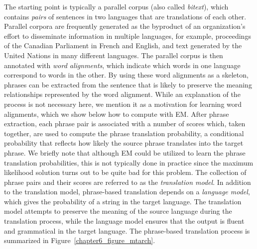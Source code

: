 The starting point is typically a parallel corpus (also called \emph{
  bitext}), which contains \emph{pairs} of sentences in two languages
that are translations of each other. Parallel corpora are frequently
generated as the byproduct of an organization's effort to disseminate
information in multiple languages, for example, proceedings of the
Canadian Parliament in French and English, and text generated by the
United Nations in many different languages.  The parallel corpus is
then annotated with \emph{word alignments}, which indicate which words
in one language correspond to words in the other.  By using these word
alignments as a skeleton, phrases can be extracted from the sentence
that is likely to preserve the meaning relationships represented by
the word alignment.  While an explanation of the process is not
necessary here, we mention it as a motivation for learning word
alignments, which we show below how to compute with EM.  After phrase
extraction, each phrase pair is associated with a number of scores
which, taken together, are used to compute the phrase translation
probability, a conditional probability that reflects how likely the
source phrase translates into the target phrase.  We briefly note that
although EM could be utilized to learn the phrase translation
probabilities, this is not typically done in practice since the
maximum likelihood solution turns out to be quite bad for this
problem.  The collection of phrase pairs and their scores are referred
to as the \emph{translation model}.  In addition to the translation
model, phrase-based translation depends on a \emph{language model},
which gives the probability of a string in the target language.  The
translation model attempts to preserve the meaning of the source
language during the translation process, while the language model
ensures that the output is fluent and grammatical in the target
language.  The phrase-based translation process is summarized in
Figure~\ref{chapter6_figure_mtarch}.

